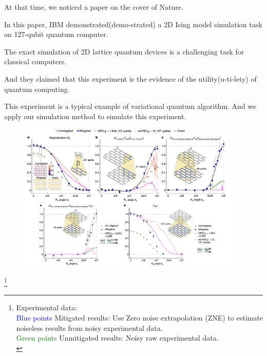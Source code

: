 \documentclass[10pt]{beamer}
\begin{document}
\begin{CJK}{UTF8}{gbsn}
{  At that time, we noticed a paper on the cover of Nature.

In this paper, IBM demonstrated(demo-strated) a 2D Ising model simulation task on 127-qubit quantum computer. 
  
The exact simulation of 2D lattice quantum devices is a challenging task for classical computers.

And they claimed that this experiment is the evidence of the utility(u-ti-lety) of quantum computing.

This experiment is a typical example of variational quantum algorithm.
And we apply our simulation method to simulate this experiment.
   
 
 
 }

 \begin{frame}[fragile]
  \begin{figure}
    \centering
    \includegraphics[width=0.95\textwidth]{fig/ibm4.png}
  \end{figure}
   \vspace{-1em}
   \footnote{Experimental data:\\
    \textcolor{blue}{Blue points} Mitigated results: Use Zero noise extrapolation (ZNE) to estimate noiseless results from noisy experimental data.\\
  \textcolor{green}{Green points} Unmitigated results: Noisy raw experimental data.\\}
\end{frame}
 \note{\scriptsize

}
\end{CJK}
\end{document}
